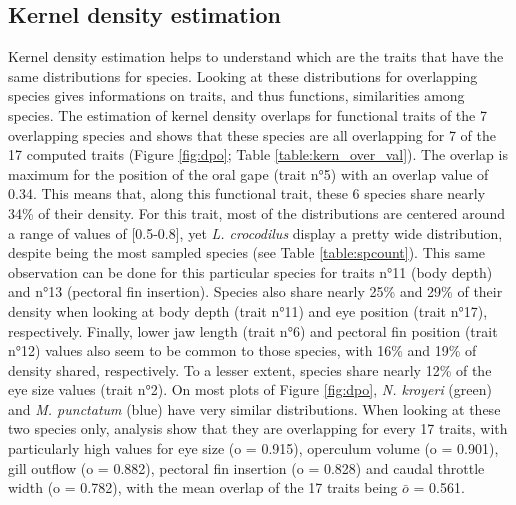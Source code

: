 \subsection{Kernel density estimation}
Kernel density estimation helps to understand which are the traits that have the same distributions for species. Looking at these distributions for overlapping species gives informations on traits, and thus functions, similarities among species. The estimation of kernel density overlaps for functional traits of the 7 overlapping species and shows that these species are all overlapping for 7 of the 17 computed traits (Figure \ref{fig:dpo}; Table \ref{table:kern_over_val}). The overlap is maximum for the position of the oral gape (trait n°5) with an overlap value of 0.34. This means that, along this functional trait, these 6 species share nearly 34\% of their density. For this trait, most of the distributions are centered around a range of values of [0.5-0.8], yet \textit{L. crocodilus} display a pretty wide distribution, despite being the most sampled species (see Table \ref{table:spcount}). This same observation can be done for this particular species for traits n°11 (body depth) and n°13 (pectoral fin insertion). Species also share nearly 25\% and 29\% of their density when looking at body depth (trait n°11) and eye position (trait n°17), respectively. Finally, lower jaw length (trait n°6) and pectoral fin position (trait n°12) values also seem to be common to those species, with 16\% and 19\% of density shared, respectively. To a lesser extent, species share nearly 12\% of the eye size values (trait n°2).
On most plots of Figure \ref{fig:dpo}, \textit{N. kroyeri} (green) and \textit{M. punctatum} (blue) have very similar distributions. When looking at these two species only, analysis show that they are overlapping for every 17 traits, with particularly high values for eye size (o = 0.915), operculum volume (o = 0.901), gill outflow (o = 0.882), pectoral fin insertion (o = 0.828) and caudal throttle width (o = 0.782), with the mean overlap of the 17 traits being $\bar{o}$ = 0.561.


